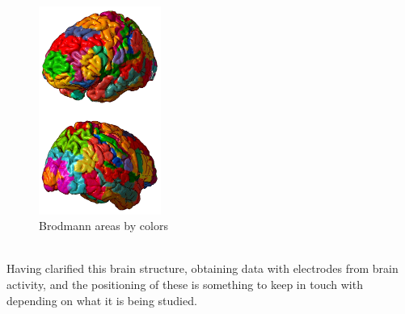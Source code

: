 \begin{figure}[H]
  \caption{Brodmann areas by colors}
  \centering
  \includegraphics[width=4cm]{img/Brodmann_areas.png}
\end{figure}
\leavevmode\\
Having clarified this brain structure, obtaining data with electrodes from brain activity, and the positioning of these is something to keep in touch with depending on what it is being studied.
\\